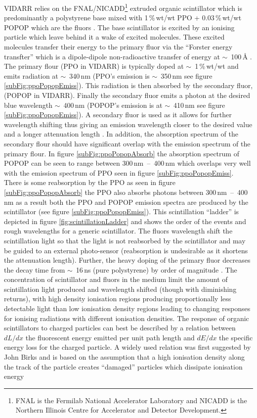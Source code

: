 VIDARR relies on the FNAL/NICADD\footnote{FNAL is the Fermilab National Accelerator Laboratory and NICADD is the Northern Illinois Centre for Accelerator and Detector Development.} extruded organic scintillator which is predominantly a polystyrene base mixed with 1\,\%\,wt/wt PPO + 0.03\,\%\,wt/wt POPOP which are the fluors \cite{pla2003extruding} \cite{theT2kExperiment2011}. The base scintillator is excited by an ionising particle which leave behind it a wake of excited molecules. These excited molecules transfer their energy to the primary fluor via the ``Forster energy transfter'' which is a dipole-dipole non-radioactive transfer of energy at $\sim$~100\,{\AA} \cite{Zyla_pdg_2020}. The primary flour (PPO in VIDARR) is typically doped at $\sim$~1\,\%\,wt/wt and emits radiation at $\sim$~340\,nm (PPO's emission is $\sim$~350\,nm see figure \ref{subFig:ppoPopopEmiss}). This radiation is then absorbed by the secondary fluor, (POPOP in VIDARR). Finally the secondary fluor emits a photon at the desired blue wavelength $\sim$~400\,nm (POPOP's emission is at $\sim$~410\,nm see figure \ref{subFig:ppoPopopEmiss}). A secondary fluor is used as it allows for further wavelength shifting thus giving an emission wavelength closer to the desired value and a longer attenuation length \cite{Zyla_pdg_2020}. In addition, the absorption spectrum of the secondary flour should have significant overlap with the emission spectrum of the primary flour. In figure \ref{subFig:ppoPopopAbsorb} the absorption spectrum of POPOP can be seen to range between 300\,nm~--~400\,nm which overlaps very well with the emission spectrum of PPO seen in figure \ref{subFig:ppoPopopEmiss}. There is some reabsorption by the PPO as seen in figure \ref{subFig:ppoPopopAbsorb} the PPO also absorbs photons between 300\,nm~--~400\,nm as a result both the PPO and POPOP emission spectra are produced by the scintillator (see figure \ref{subFig:ppoPopopEmiss}). This scintillation ``ladder'' is depicted in figure \ref{fig:scintillationLadder} and shows the order of the events and rough wavelengths for a generic scintillator. The fluors wavelength shift the scintillation light so that the light is not reabsorbed by the scintillator and may be guided to an external photo-sensor (reabsorption is undesirable as it shortens the attenuation length). Further, the heavy doping of the primary fluor decreases the decay time from $\sim$~16\,ns (pure polystyrene) by order of magnitude \cite{Zyla_pdg_2020}. The concentration of scintillator and fluors in the medium limit the amount of scintillation light produced and wavelength shifted (though with diminishing returns), with high density ionisation regions producing proportionally less detectable light than low ionisation density regions leading to changing responses for ionising radiations with different ionisation densities. The response of organic scintillators to charged particles can best be described by a relation between $dL/dx$ the fluorescent energy emitted per unit path length and $dE/dx$ the specific energy loss for the charged particle. A widely used relation was first suggested by John Birks \cite{birks_1964} and is based on the assumption that a high ionisation density along the track of the particle creates ``damaged'' particles which dissipate ionisation energy 